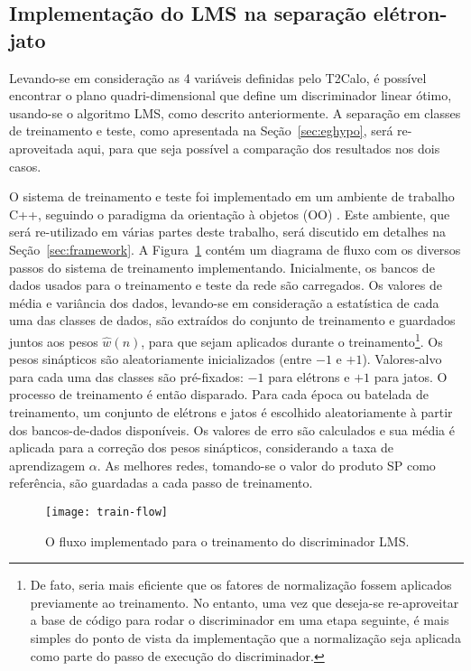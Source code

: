 \subsection{Implementação do LMS na separação e\-lé\-tron-jato}
\label{sec:lms-ej}

Levando-se em consideração as 4 variáveis definidas pelo T2Calo, é possível
encontrar o plano quadri-dimensional que define um discriminador linear ótimo,
usando-se o algoritmo LMS, como descrito anteriormente. A separação em classes
de treinamento e teste, como apresentada na Seção~\ref{sec:eghypo}, será
re-aproveitada aqui, para que seja possível a comparação dos resultados nos
dois casos.

O sistema de treinamento e teste foi implementado em um ambiente de trabalho
C++, seguindo o paradigma da orientação à objetos (OO) \cite{stroustrup,
booch}. Este ambiente, que será re-utilizado em várias partes deste trabalho,
será discutido em detalhes na Seção~\ref{sec:framework}. A
Figura~\ref{fig:train-flow} contém um diagrama de fluxo com os diversos passos
do sistema de treinamento implementando. Inicialmente, os bancos de dados
usados para o treinamento e teste da rede são carregados. Os valores de média
e variância dos dados, levando-se em consideração a estatística de cada uma
das classes de dados, são extraídos do conjunto de treinamento e guardados
juntos aos pesos $\hat{w}(n)$, para que sejam aplicados durante o
treinamento\footnote{De fato, seria mais eficiente que os fatores de
normalização fossem aplicados previamente ao treinamento. No entanto, uma vez
que deseja-se re-aproveitar a base de código para rodar o discriminador em uma
etapa seguinte, é mais simples do ponto de vista da implementação que a
normalização seja aplicada como parte do passo de execução do
discriminador.}. Os pesos sinápticos são aleatoriamente inicializados (entre
$-1$ e $+1$). Valores-alvo para cada uma das classes são pré-fixados: $-1$
para elétrons e $+1$ para jatos. O processo de treinamento é então
disparado. Para cada época ou batelada de treinamento, um conjunto de elétrons
e jatos é escolhido aleatoriamente à partir dos bancos-de-dados
disponíveis. Os valores de erro são calculados e sua média é aplicada para a
correção dos pesos sinápticos, considerando a taxa de aprendizagem
$\alpha$. As melhores redes, tomando-se o valor do produto SP como referência,
são guardadas a cada passo de treinamento. 

\begin{figure}
\begin{center}
\texttt{[image: train-flow]}
\end{center}
\caption{O fluxo implementado para o treinamento do discriminador LMS.}
\label{fig:train-flow}
\end{figure}

